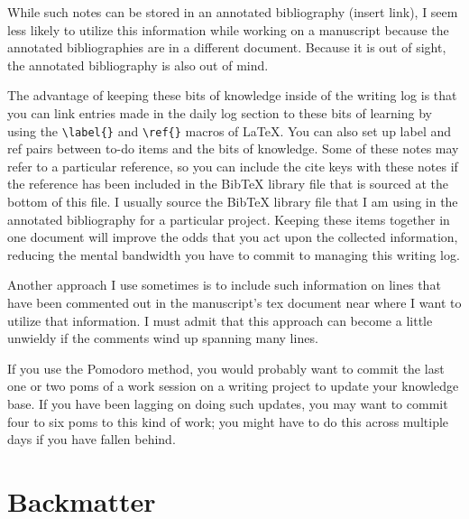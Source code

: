 \documentclass[10pt,letterpaper]{article}
\begin{document}
While such notes can be stored in an annotated bibliography (insert link), I seem less likely to utilize this information while working on a manuscript because the annotated bibliographies are in a different document.
Because it is out of sight, the annotated bibliography is also out of mind.

The advantage of keeping these bits of knowledge inside of the writing log is that you can link entries made in the daily log section to these bits of learning by using the \verb|\label{}| and \verb|\ref{}| macros of \LaTeX.
You can also set up label and ref pairs between to-do items and the bits of knowledge.
Some of these notes may refer to a particular reference, so you can include the cite keys with these notes if the reference has been included in the BibTeX library file that is sourced at the bottom of this file.
I usually source the BibTeX library file that I am using in the annotated bibliography for a particular project.
Keeping these items together in one document will improve the odds that you act upon the collected information, reducing the mental bandwidth you have to commit to managing this writing log.

Another approach I use sometimes is to include such information on lines that have been commented out in the manuscript's tex document near where I want to utilize that information.
I must admit that this approach can become a little unwieldy if the comments wind up spanning many lines.

If you use the Pomodoro method, you would probably want to commit the last one or two poms of a work session on a writing project to update your knowledge base.
If you have been lagging on doing such updates, you may want to commit four to six poms to this kind of work; you might have to do this across multiple days if you have fallen behind.


\section{Backmatter}

%

\printindex
\end{document}
